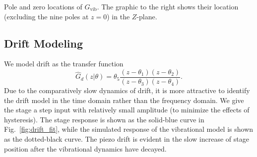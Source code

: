 \documentclass[twocolumn,twoside]{IEEEtran}
\newcommand{\Gv}{\ensuremath{G_{\text{vib}}}\xspace}
\begin{document}
\begin{table}
  \caption{Pole and zero locations of $G_{\textrm{vib}}$. The graphic to the right shows their location (excluding the nine poles at $z=0$) in the $Z$-plane.}
  \label{tab:pzgvib}
  \begin{minipage}[T]{.6\linewidth}
    \small
    
\end{minipage}%
\begin{minipage}[T]{.3\linewidth}
  
\end{minipage}
\end{table}


\subsection{Drift Modeling}\label{sec:drift_model}
We model drift as the transfer function
\begin{equation}
\hat{G}_d(z|\theta) = \theta_5\frac{(z-\theta_1)(z-\theta_2)}{(z-\theta_3)(z-\theta_4)}.\nonumber
\end{equation}
Due to the comparatively slow dynamics of drift, it is more attractive to identify the drift model in the time domain rather than the frequency domain. 
We give the stage a step input with relatively small amplitude (to minimize the effects of hysteresis). The stage response is shown as the solid-blue curve in Fig.~\ref{fig:drift_fit}, while the simulated response of the vibrational model is shown as the dotted-black curve. The piezo drift is evident in the slow increase of stage position after the vibrational dynamics have decayed. 
\end{document}
